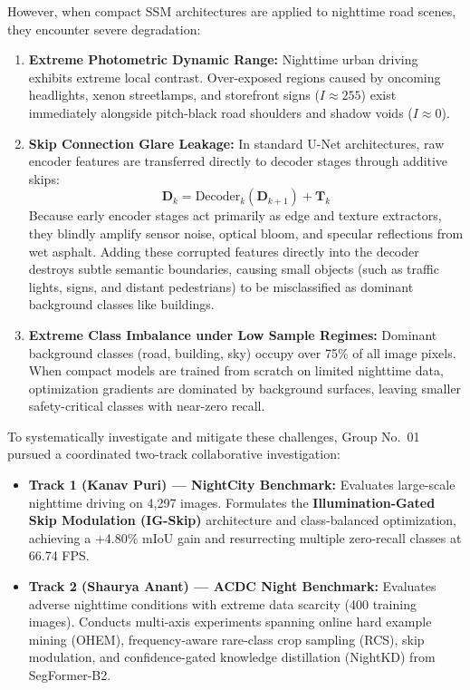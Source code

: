 \documentclass[conference]{IEEEtran}
\begin{document}
However, when compact SSM architectures are applied to nighttime road scenes, they encounter severe degradation:
\begin{enumerate}
    \item \textbf{Extreme Photometric Dynamic Range:} Nighttime urban driving exhibits extreme local contrast. Over-exposed regions caused by oncoming headlights, xenon streetlamps, and storefront signs ($I \approx 255$) exist immediately alongside pitch-black road shoulders and shadow voids ($I \approx 0$).
    \item \textbf{Skip Connection Glare Leakage:} In standard U-Net architectures, raw encoder features are transferred directly to decoder stages through additive skips:
    \begin{equation}
    \mathbf{D}_k = \text{Decoder}_k(\mathbf{D}_{k+1}) + \mathbf{T}_k
    \end{equation}
    Because early encoder stages act primarily as edge and texture extractors, they blindly amplify sensor noise, optical bloom, and specular reflections from wet asphalt. Adding these corrupted features directly into the decoder destroys subtle semantic boundaries, causing small objects (such as traffic lights, signs, and distant pedestrians) to be misclassified as dominant background classes like buildings.
    \item \textbf{Extreme Class Imbalance under Low Sample Regimes:} Dominant background classes (road, building, sky) occupy over 75\% of all image pixels. When compact models are trained from scratch on limited nighttime data, optimization gradients are dominated by background surfaces, leaving smaller safety-critical classes with near-zero recall.
\end{enumerate}

To systematically investigate and mitigate these challenges, Group No.~01 pursued a coordinated two-track collaborative investigation:
\begin{itemize}
    \item \textbf{Track 1 (Kanav Puri) --- NightCity Benchmark:} Evaluates large-scale nighttime driving on 4,297 images. Formulates the \textbf{Illumination-Gated Skip Modulation (IG-Skip)} architecture and class-balanced optimization, achieving a +4.80\% mIoU gain and resurrecting multiple zero-recall classes at 66.74 FPS.
    \item \textbf{Track 2 (Shaurya Anant) --- ACDC Night Benchmark:} Evaluates adverse nighttime conditions with extreme data scarcity (400 training images). Conducts multi-axis experiments spanning online hard example mining (OHEM), frequency-aware rare-class crop sampling (RCS), skip modulation, and confidence-gated knowledge distillation (NightKD) from SegFormer-B2.
\end{itemize}
\end{document}
